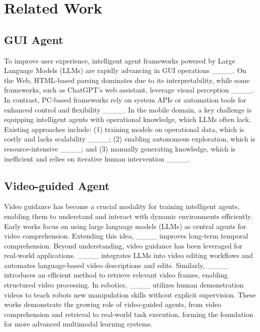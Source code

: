 \section{Related Work}
\subsection{GUI Agent}
To improve user experience, intelligent agent frameworks powered by Large Language Models (LLMs) are rapidly advancing in GUI operations ____. On the Web, HTML-based parsing dominates due to its interpretability, while some frameworks, such as ChatGPT’s web assistant, leverage visual perception ____. In contrast, PC-based frameworks rely on system APIs or automation tools for enhanced control and flexibility ____. In the mobile domain, a key challenge is equipping intelligent agents with operational knowledge, which LLMs often lack. Existing approaches include: (1) training models on operational data, which is costly and lacks scalability ____; (2) enabling autonomous exploration, which is resource-intensive ____; and (3) manually generating knowledge, which is inefficient and relies on iterative human intervention ____.

\subsection{Video-guided Agent}
Video guidance has become a crucial modality for training intelligent agents, enabling them to understand and interact with dynamic environments efficiently. Early works focus on using large language models (LLMs) as central agents for video comprehension. Extending this idea, ____ improves long-term temporal comprehension. Beyond understanding, video guidance has been leveraged for real-world applications. ____ integrates LLMs into video editing workflows and automates language-based video descriptions and edits. Similarly, ____ introduces an efficient method to retrieve relevant video frames, enabling structured video processing. In robotics, ____ utilizes human demonstration videos to teach robots new manipulation skills without explicit supervision. These works demonstrate the growing role of video-guided agents, from video comprehension and retrieval to real-world task execution, forming the foundation for more advanced multimodal learning systems.
